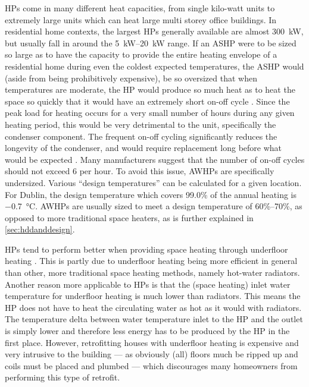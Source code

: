 \acp{HP} come in many different heat capacities, from single kilo-watt units to extremely large units which can heat large multi storey office buildings. In residential home contexts, the largest \acp{HP} generally available are almost \SI{300}{\kilo\watt}, but usually fall in around the \qtyrange{5}{20}{\kilo\watt} range. If an \ac{ASHP} were to be sized so large as to have the capacity to provide the entire heating envelope of a residential home during even the coldest expected temperatures, the \ac{ASHP} would (aside from being prohibitively expensive), be so oversized that when temperatures are moderate, the \ac{HP} would produce so much heat as to heat the space so quickly that it would have an extremely short on-off cycle \cite{bee_air-source_2019}. Since the peak load for heating occurs for a very small number of hours during any given heating period, this would be very detrimental to the unit, specifically the condenser component. The frequent on-off cycling significantly reduces the longevity of the condenser, and would require replacement long before what would be expected \cite{STIEBEL_2012}. Many manufacturers suggest that the number of on-off cycles should not exceed 6 per hour. %
To avoid this issue, \acp{AWHP} are specifically undersized. Various ``design temperatures'' can be calculated for a given location. For Dublin, the design temperature which covers 99.0\% of the annual heating is \SI{-0.7}{\celsius}. \acp{AWHP} are usually sized to meet a design temperature of 60\%--70\%, as opposed to more traditional space heaters, as is further explained in \cref{sec:hddanddesign}.

\acp{HP} tend to perform better when providing space heating through underfloor heating \cite{seai_heat_2020}. This is partly due to underfloor heating being more efficient in general than other, more traditional space heating methods, namely hot-water radiators. Another reason more applicable to \acp{HP} is that the (space heating) inlet water temperature for underfloor heating is much lower than radiators. This means the \ac{HP} does not have to heat the circulating water as hot as it would with radiators. The temperature delta between water temperature inlet to the \ac{HP} and the outlet is simply lower and therefore less energy has to be produced by the \ac{HP} in the first place. However, retrofitting houses with underfloor heating is expensive and very intrusive to the building --- as obviously (all) floors much be ripped up and coils must be placed and plumbed --- which discourages many homeowners from performing this type of retrofit.

